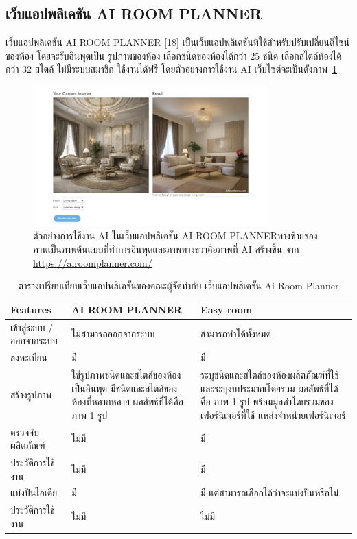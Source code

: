 \documentclass[12pt,oneside,openright,a4paper]{cpe-thai-project}
\begin{document}
\subsection{เว็บแอปพลิเคชัน AI ROOM PLANNER}
\hspace {18pt} เว็บแอปพลิเคชัน AI ROOM PLANNER [18] เป็นเว็บแอปพลิเคชันที่ใช้สำหรับปรับเปลี่ยนดีไซน์ของห้อง โดยจะรับอินพุตเป็น รูปภาพของห้อง เลือกชนิดของห้องได้กว่า 25 ชนิด เลือกสไตล์ห้องได้กว่า 32 สไตล์  ไม่มีระบบสมาชิก ใช้งานได้ฟรี โดยตัวอย่างการใช้งาน AI เว็บไซต์จะเป็นดังภาพ~\ref{fig:planner}

\begin{figure}[!h]\centering
\includegraphics[width=9cm]{image/planner.jpg}
\caption{ตัวอย่างการใช้งาน AI ในเว็บแอปพลิเคชัน AI ROOM PLANNERทางซ้ายของภาพเป็นภาพต้นแบบที่ทำการอินพุตและภาพทางขวาคือภาพที่ AI สร้างขึ้น จาก \url{https://airoomplanner.com/}}
\label{fig:planner}
\end{figure}

\begin{table}[!h]
\caption{ตารางเปรียบเทียบเว็บแอปพลิเคชันของคณะผู้จัดทำกับ เว็บแอปพลิเคชัน Ai Room Planner }\label{tbl:planner-table}
  \begin{tabular}{|p{4cm}|p{5cm}|p{5cm}|}
  \hline
  \textbf{Features} & \textbf{AI ROOM PLANNER} & \textbf{Easy room } \\
  \hline
  เข้าสู่ระบบ / ออกจากระบบ & ไม่สามารถออกจากระบบ & สามารถทำได้ทั้งหมด \\
  \hline
  ลงทะเบียน & มี & มี \\
  \hline
  สร้างรูปภาพ & ใช้รูปภาพชนิดและสไตล์ของห้องเป็นอินพุต มีชนิดและสไตล์ของห้องที่หลากหลาย ผลลัพธ์ที่ได้คือ ภาพ 1 รูป  & ระบุชนิดและสไตล์ของห้องผลิตภัณฑ์ที่ใช้และระบุงบประมาณโดยรวม ผลลัพธ์ที่ได้คือ ภาพ 1 รูป พร้อมมูลค่าโดยรวมของเฟอร์นิเจอร์ที่ใช้ แหล่งจำหน่ายเฟอร์นิเจอร์ \\
  \hline
  ตรวจจับผลิตภัณฑ์ & ไม่มี & มี \\
  \hline
  ประวัติการใช้งาน & ไม่มี & มี \\
  \hline
  แบ่งปันไอเดีย & มี  & มี แต่สามารถเลือกได้ว่าจะแบ่งปันหรือไม่ \\
  \hline
  ประวัติการใช้งาน & ไม่มี & ไม่มี \\
  \hline
\end{tabular}
\end{table}
\end{document}
